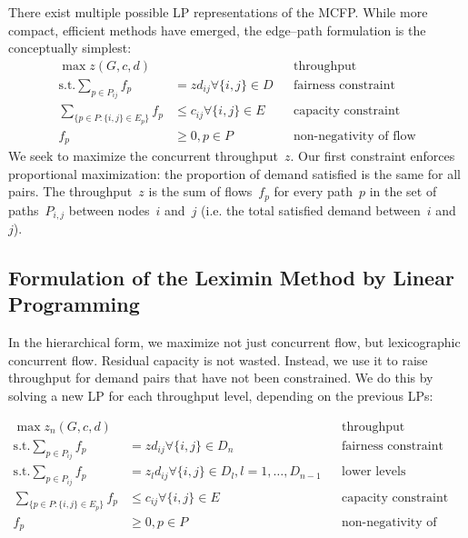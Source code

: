 There exist multiple possible LP representations of the MCFP. While more compact, efficient methods have emerged, the edge--path formulation is the conceptually simplest:
\begin{align}
    \max z(G, c, d)  & && \text{throughput} \nonumber\\
    \mathrm{s.t.} \sum_{p \in P_{ij}} f_p &= zd_{ij} \forall \{i, j\} \in D && \text{fairness constraint} \nonumber\\
    \sum_{\{p \in P:\{i,j\} \in E_p\}} f_p &\leq c_{ij} \forall \{i, j\} \in E && \text{capacity constraint} \nonumber\\
    f_p &\geq 0,  p \in P && \text{non-negativity of flow} \label{eq:mcfp}
\end{align}
We seek to maximize the concurrent throughput~$z$. Our first constraint enforces proportional maximization: the proportion of demand satisfied is the same for all pairs. The throughput~$z$ is  the sum of flows~$f_p$ for every path~$p$ in the set of paths~$P_{i, j}$ between nodes~$i$ and~$j$ (i.e. the total satisfied demand between~$i$ and~$j$).

\subsection{Formulation of the Leximin Method by Linear Programming}

In the hierarchical form, we maximize not just concurrent flow, but lexicographic concurrent flow. Residual capacity is not wasted. Instead, we use it to raise throughput for demand pairs that have not been constrained. We do this by solving a new LP for each throughput level, depending on the previous LPs: 

\begin{align}
    \max z_n(G, c, d)  & && \text{throughput} \nonumber\\
    \mathrm{s.t.} \sum_{p \in P_{ij}} f_p &= z d_{ij} \forall \{i, j\} \in D_n && \text{fairness constraint} \nonumber\\
    \mathrm{s.t.} \sum_{p \in P_{ij}} f_p &= z_l d_{ij} \forall \{i, j\} \in D_l, l = 1,\ldots,D_{n-1} && \text{lower levels constraint} \nonumber\\
    \sum_{\{p \in P:\{i,j\} \in E_p\}} f_p &\leq c_{ij} \forall \{i, j\} \in E && \text{capacity constraint} \nonumber\\
    f_p &\geq 0,  p \in P && \text{non-negativity of flow} \label{eq:mcfp}
\end{align}


